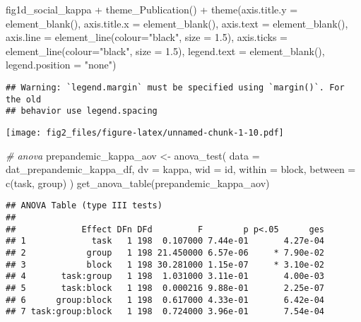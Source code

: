 \documentclass[
]{article}
\newenvironment{Shaded}{\begin{snugshade}}{\end{snugshade}}
\newcommand{\AttributeTok}[1]{\textcolor[rgb]{0.77,0.63,0.00}{#1}}
\newcommand{\CommentTok}[1]{\textcolor[rgb]{0.56,0.35,0.01}{\textit{#1}}}
\newcommand{\FloatTok}[1]{\textcolor[rgb]{0.00,0.00,0.81}{#1}}
\newcommand{\FunctionTok}[1]{\textcolor[rgb]{0.00,0.00,0.00}{#1}}
\newcommand{\NormalTok}[1]{#1}
\newcommand{\OtherTok}[1]{\textcolor[rgb]{0.56,0.35,0.01}{#1}}
\newcommand{\SpecialCharTok}[1]{\textcolor[rgb]{0.00,0.00,0.00}{#1}}
\newcommand{\StringTok}[1]{\textcolor[rgb]{0.31,0.60,0.02}{#1}}
\begin{document}
\begin{Shaded}
\begin{Highlighting}[]
\NormalTok{fig1d\_social\_kappa }\SpecialCharTok{+} \FunctionTok{theme\_Publication}\NormalTok{() }\SpecialCharTok{+} \FunctionTok{theme}\NormalTok{(}\AttributeTok{axis.title.y =} \FunctionTok{element\_blank}\NormalTok{(),}
                                                  \AttributeTok{axis.title.x =} \FunctionTok{element\_blank}\NormalTok{(),}
                                                  \AttributeTok{axis.text =} \FunctionTok{element\_blank}\NormalTok{(), }
                                                  \AttributeTok{axis.line =} \FunctionTok{element\_line}\NormalTok{(}\AttributeTok{colour=}\StringTok{"black"}\NormalTok{, }\AttributeTok{size =} \FloatTok{1.5}\NormalTok{),}
                                                  \AttributeTok{axis.ticks =} \FunctionTok{element\_line}\NormalTok{(}\AttributeTok{colour=}\StringTok{"black"}\NormalTok{, }\AttributeTok{size =} \FloatTok{1.5}\NormalTok{),}
                                                  \AttributeTok{legend.text =} \FunctionTok{element\_blank}\NormalTok{(),}
                                                  \AttributeTok{legend.position =} \StringTok{"none"}\NormalTok{)}
\end{Highlighting}
\end{Shaded}

\begin{verbatim}
## Warning: `legend.margin` must be specified using `margin()`. For the old
## behavior use legend.spacing
\end{verbatim}

\texttt{[image: fig2\_files/figure-latex/unnamed-chunk-1-10.pdf]}

\begin{Shaded}
\begin{Highlighting}[]
\CommentTok{\# anova}
\NormalTok{prepandemic\_kappa\_aov }\OtherTok{\textless{}{-}} \FunctionTok{anova\_test}\NormalTok{(}
  \AttributeTok{data =}\NormalTok{ dat\_prepandemic\_kappa\_df, }\AttributeTok{dv =}\NormalTok{ kappa, }\AttributeTok{wid =}\NormalTok{ id,}
  \AttributeTok{within =}\NormalTok{ block, }\AttributeTok{between =} \FunctionTok{c}\NormalTok{(task, group)}
\NormalTok{)}
\FunctionTok{get\_anova\_table}\NormalTok{(prepandemic\_kappa\_aov)}
\end{Highlighting}
\end{Shaded}

\begin{verbatim}
## ANOVA Table (type III tests)
## 
##             Effect DFn DFd         F        p p<.05      ges
## 1             task   1 198  0.107000 7.44e-01       4.27e-04
## 2            group   1 198 21.450000 6.57e-06     * 7.90e-02
## 3            block   1 198 30.281000 1.15e-07     * 3.10e-02
## 4       task:group   1 198  1.031000 3.11e-01       4.00e-03
## 5       task:block   1 198  0.000216 9.88e-01       2.25e-07
## 6      group:block   1 198  0.617000 4.33e-01       6.42e-04
## 7 task:group:block   1 198  0.724000 3.96e-01       7.54e-04
\end{verbatim}
\end{document}
